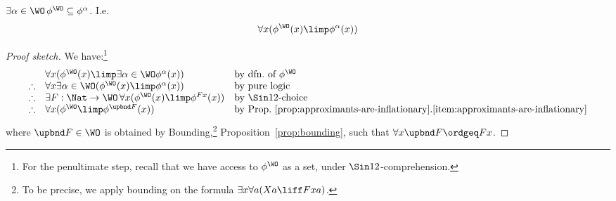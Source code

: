 \begin{lemma}
    \label{lem:closure-ordinals}
    $\exists \alpha \in \WO \, \phi^\WO \subseteq \phi^\alpha$.
    I.e.\ 
    \[
    \forall x (\phi^\WO(x) \limp \phi^\alpha(x))
    \]
\end{lemma}
\begin{proof}
    [Proof sketch]
    We have:\footnote{For the penultimate step, recall that we have access to $\phi^\WO$ as a set, under $\Sin 1 2$-comprehension.}
    \[
    \begin{array}{rll}
         & \forall x (\phi^\WO(x) \limp \exists \alpha \in \WO \phi^\alpha(x)) & \text{by dfn.\ of $\phi^\WO$}\\
         \therefore & \forall x \exists \alpha \in \WO (\phi^\WO(x) \limp \phi^\alpha(x)) & \text{by pure logic}\\
         \therefore & \exists F : \Nat \to \WO \, \forall x (\phi^\WO(x) \limp \phi^{Fx}(x))  & \text{by $\Sin 1 2 $-choice}\\
         \therefore & \forall x (\phi^\WO \limp \phi^{\upbnd F }(x)) & \text{by Prop.~\ref{prop:approximants-are-inflationary}.\ref{item:approximants-are-inflationary}}
    \end{array}
    \]
    where $\upbnd F\in \WO$ is obtained by Bounding,\footnote{To be precise, we apply bounding on the formula $\exists x \forall a (Xa \liff Fxa)$.} Proposition~\ref{prop:bounding}, such that $\forall x \upbnd F \ordgeq Fx$.
\end{proof}


